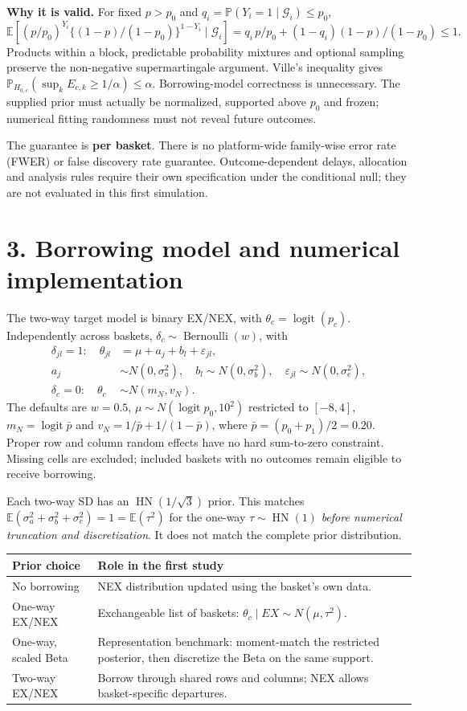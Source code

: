 \documentclass[10pt,a4paper]{article}
\newcommand{\E}{\mathbb E}
\newcommand{\Prob}{\mathbb P}
\newcommand{\logit}{\operatorname{logit}}
\newcommand{\HN}{\operatorname{HN}}
\begin{document}
\textbf{Why it is valid.} For fixed $p>p_0$ and
$q_i=\Prob(Y_i=1\mid\mathcal G_i)\le p_0$,
\[
 \E\!\left[
  (p/p_0)^{Y_i}\{(1-p)/(1-p_0)\}^{1-Y_i}
  \mid\mathcal G_i\right]
 =q_i\,p/p_0+(1-q_i)(1-p)/(1-p_0)\le1.
\]
Products within a block, predictable probability mixtures and optional
sampling preserve the non-negative supermartingale argument. Ville's
inequality gives $\Prob_{H_{0,c}}(\sup_k E_{c,k}\ge1/\alpha)\le\alpha$.
Borrowing-model correctness is unnecessary. The supplied prior must actually
be normalized, supported above $p_0$ and frozen; numerical fitting randomness
must not reveal future outcomes.

The guarantee is \textbf{per basket}. There is no platform-wide family-wise
error rate (FWER) or false discovery rate guarantee. Outcome-dependent
delays, allocation and analysis rules require their own specification under
the conditional null; they are not evaluated in this first simulation.

\newpage
\section*{3. Borrowing model and numerical implementation}
The two-way target model is binary EX/NEX, with $\theta_c=\logit(p_c)$.
Independently across baskets, $\delta_c\sim\operatorname{Bernoulli}(w)$, with
\[
 \begin{aligned}
  \delta_{jl}=1:\quad \theta_{jl}
       &=\mu+a_j+b_l+\varepsilon_{jl},\\
  a_j&\sim N(0,\sigma_a^2),\quad
  b_l\sim N(0,\sigma_b^2),\quad
  \varepsilon_{jl}\sim N(0,\sigma_e^2),\\
  \delta_c=0:\quad \theta_c&\sim N(m_N,v_N).
 \end{aligned}
\]
The defaults are $w=0.5$, $\mu\sim N(\logit p_0,10^2)$ restricted to
$[-8,4]$, $m_N=\logit\bar p$ and
$v_N=1/\bar p+1/(1-\bar p)$, where $\bar p=(p_0+p_1)/2=0.20$.
Proper row and column random effects have no hard sum-to-zero constraint.
Missing cells are excluded; included baskets with no outcomes remain eligible
to receive borrowing.

Each two-way SD has an $\HN(1/\sqrt3)$ prior. This matches
$\E(\sigma_a^2+\sigma_b^2+\sigma_e^2)=1=\E(\tau^2)$ for the one-way
$\tau\sim\HN(1)$ \emph{before numerical truncation and discretization}.
It does not match the complete prior distribution.

\begin{tabularx}{\linewidth}{@{}p{3.8cm}X@{}}
\toprule
Prior choice & Role in the first study\\
\midrule
No borrowing & NEX distribution updated using the basket's own data.\\
One-way EX/NEX & Exchangeable list of baskets: $\theta_c\mid EX\sim N(\mu,\tau^2)$.\\
One-way, scaled Beta & Representation benchmark: moment-match the restricted posterior, then discretize the Beta on the same support.\\
Two-way EX/NEX & Borrow through shared rows and columns; NEX allows basket-specific departures.\\
\bottomrule
\end{tabularx}
\end{document}
